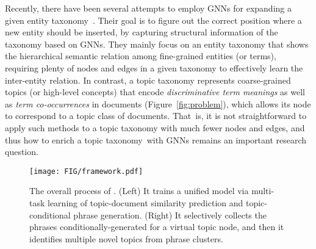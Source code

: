 \label{subsec:taxoexpan}
Recently, there have been several attempts to employ GNNs for expanding a given entity taxonomy~\cite{mao2020octet,shen2020taxoexpan,zeng2021enhancing}.
Their goal is to figure out the correct position where a new entity should be inserted, by capturing structural information of the taxonomy based on GNNs.
They mainly focus on an entity taxonomy that shows the hierarchical semantic relation among fine-grained entities (or terms), requiring plenty of nodes and edges in a given taxonomy to effectively learn the inter-entity relation.
In contrast, a topic taxonomy represents coarse-grained topics (or high-level concepts) that encode \textit{discriminative term meanings} as well as \textit{term co-occurrences} in documents (Figure~\ref{fig:problem}), which allows its node to correspond to a topic class of documents.
That~is, it is not straightforward to apply such methods to a topic taxonomy with much fewer nodes and edges, and thus how to enrich a topic taxonomy~with GNNs remains an important research question.

\begin{figure*}[t]
    \centering
    \texttt{[image: FIG/framework.pdf]}
    \caption{The overall process of \proposed. 
    (Left) It trains a unified model via multi-task learning of topic-document similarity prediction and topic-conditional phrase generation.
    (Right) It selectively collects the phrases conditionally-generated for a virtual topic node, and then it identifies multiple novel topics from phrase clusters. %
    }
    \label{fig:framework}
\end{figure*}

